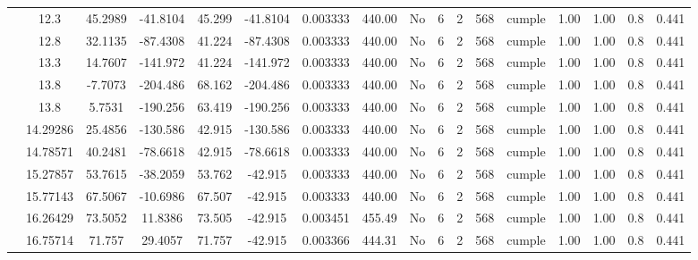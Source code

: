 \begin{table}[H]
{\begin{tabular}{|c|c|c|c|c|c|c|c|c|c|c|c|c|c|c|c|c|}
\cline{2-17}        & 12.3 & 45.2989 & -41.8104 & 45.299 & -41.8104 & 0.003333 & 440.00 & No  & 6   & 2   & 568 & \cellcolor[rgb]{ .776,  .937,  .808}cumple & 1.00 & 1.00 & 0.8 & 0.441 \bigstrut\\
\cline{2-17}        & 12.8 & 32.1135 & -87.4308 & 41.224 & -87.4308 & 0.003333 & 440.00 & No  & 6   & 2   & 568 & \cellcolor[rgb]{ .776,  .937,  .808}cumple & 1.00 & 1.00 & 0.8 & 0.441 \bigstrut\\
\cline{2-17}        & 13.3 & 14.7607 & -141.972 & 41.224 & -141.972 & 0.003333 & 440.00 & No  & 6   & 2   & 568 & \cellcolor[rgb]{ .776,  .937,  .808}cumple & 1.00 & 1.00 & 0.8 & 0.441 \bigstrut\\
\cline{2-17}        & \cellcolor[rgb]{ .851,  .882,  .949}13.8 & -7.7073 & -204.486 & 68.162 & -204.486 & 0.003333 & 440.00 & No  & 6   & 2   & 568 & \cellcolor[rgb]{ .776,  .937,  .808}cumple & 1.00 & 1.00 & 0.8 & 0.441 \bigstrut\\
\cline{2-17}        & \cellcolor[rgb]{ .851,  .882,  .949}13.8 & 5.7531 & -190.256 & 63.419 & -190.256 & 0.003333 & 440.00 & No  & 6   & 2   & 568 & \cellcolor[rgb]{ .776,  .937,  .808}cumple & 1.00 & 1.00 & 0.8 & 0.441 \bigstrut\\
\cline{2-17}        & 14.29286 & 25.4856 & -130.586 & 42.915 & -130.586 & 0.003333 & 440.00 & No  & 6   & 2   & 568 & \cellcolor[rgb]{ .776,  .937,  .808}cumple & 1.00 & 1.00 & 0.8 & 0.441 \bigstrut\\
\cline{2-17}        & 14.78571 & 40.2481 & -78.6618 & 42.915 & -78.6618 & 0.003333 & 440.00 & No  & 6   & 2   & 568 & \cellcolor[rgb]{ .776,  .937,  .808}cumple & 1.00 & 1.00 & 0.8 & 0.441 \bigstrut\\
\cline{2-17}        & 15.27857 & 53.7615 & -38.2059 & 53.762 & -42.915 & 0.003333 & 440.00 & No  & 6   & 2   & 568 & \cellcolor[rgb]{ .776,  .937,  .808}cumple & 1.00 & 1.00 & 0.8 & 0.441 \bigstrut\\
\cline{2-17}        & 15.77143 & 67.5067 & -10.6986 & 67.507 & -42.915 & 0.003333 & 440.00 & No  & 6   & 2   & 568 & \cellcolor[rgb]{ .776,  .937,  .808}cumple & 1.00 & 1.00 & 0.8 & 0.441 \bigstrut\\
\cline{2-17}        & 16.26429 & 73.5052 & 11.8386 & 73.505 & -42.915 & 0.003451 & 455.49 & No  & 6   & 2   & 568 & \cellcolor[rgb]{ .776,  .937,  .808}cumple & 1.00 & 1.00 & 0.8 & 0.441 \bigstrut\\
\cline{2-17}        & 16.75714 & 71.757 & 29.4057 & 71.757 & -42.915 & 0.003366 & 444.31 & No  & 6   & 2   & 568 & \cellcolor[rgb]{ .776,  .937,  .808}cumple & 1.00 & 1.00 & 0.8 & 0.441 \bigstrut\\

\end{tabular}}
\end{table}

